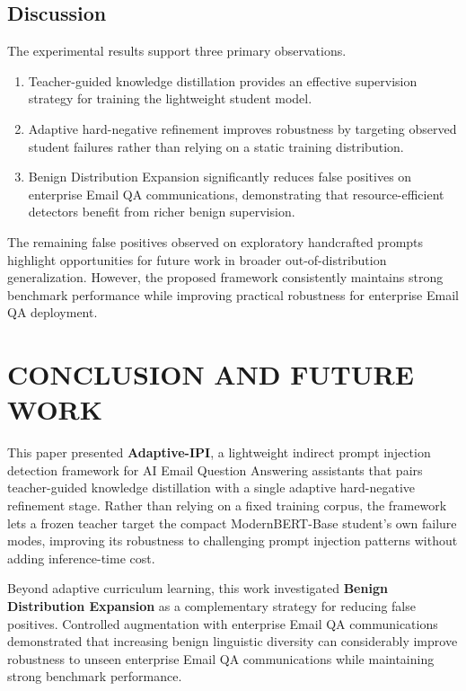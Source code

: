 \documentclass[conference]{IEEEtran}
\begin{document}
\subsection{Discussion}

The experimental results support three primary observations.

\begin{enumerate}
    \item Teacher-guided knowledge distillation provides an effective supervision strategy for training the lightweight student model.
    \item Adaptive hard-negative refinement improves robustness by targeting observed student failures rather than relying on a static training distribution.
    \item Benign Distribution Expansion significantly reduces false positives on enterprise Email QA communications, demonstrating that resource-efficient detectors benefit from richer benign supervision.
\end{enumerate}

The remaining false positives observed on exploratory handcrafted prompts highlight opportunities
for future work in broader out-of-distribution generalization. However, the proposed framework
consistently maintains strong benchmark performance while improving practical robustness for
enterprise Email QA deployment.

\section{CONCLUSION AND FUTURE WORK}

This paper presented \textbf{Adaptive-IPI}, a lightweight indirect prompt injection detection
framework for AI Email Question Answering assistants that pairs teacher-guided knowledge
distillation with a single adaptive hard-negative refinement stage. Rather than relying on a fixed
training corpus, the framework lets a frozen teacher target the compact ModernBERT-Base student's
own failure modes, improving its robustness to challenging prompt injection patterns without adding
inference-time cost.

Beyond adaptive curriculum learning, this work investigated \textbf{Benign Distribution Expansion}
as a complementary strategy for reducing false positives. Controlled augmentation with enterprise
Email QA communications demonstrated that increasing benign linguistic diversity can considerably
improve robustness to unseen enterprise Email QA communications while maintaining strong benchmark
performance.
\end{document}
